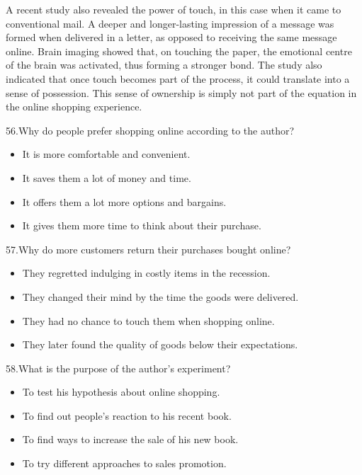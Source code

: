 \documentclass[UTF8,11pt]{ctexart}
\begin{document}
A recent study also revealed the power of touch, in this case when it came to conventional mail. A deeper and longer-lasting impression of a message was formed when delivered in a letter, as opposed to receiving the same message online. Brain imaging showed that, on touching the paper, the emotional centre of the brain was activated, thus forming a stronger bond. The study also indicated that once touch becomes part of the process, it could translate into a sense of possession. This sense of ownership is simply not part of the equation in the online shopping experience.


56.Why do people prefer shopping online according to the author?


\begin{itemize}[leftmargin=2em,itemsep=.2em,topsep=.4em]\item[A.] It is more comfortable and convenient.
\item[B.] It saves them a lot of money and time.
\item[C.] It offers them a lot more options and bargains.
\item[D.] It gives them more time to think about their purchase.
\end{itemize}

57.Why do more customers return their purchases bought online?


\begin{itemize}[leftmargin=2em,itemsep=.2em,topsep=.4em]\item[A.] They regretted indulging in costly items in the recession.
\item[B.] They changed their mind by the time the goods were delivered.
\item[C.] They had no chance to touch them when shopping online.
\item[D.] They later found the quality of goods below their expectations.
\end{itemize}

58.What is the purpose of the author’s experiment?


\begin{itemize}[leftmargin=2em,itemsep=.2em,topsep=.4em]\item[A.] To test his hypothesis about online shopping.
\item[B.] To find out people’s reaction to his recent book.
\item[C.] To find ways to increase the sale of his new book.
\item[D.] To try different approaches to sales promotion.
\end{itemize}
\end{document}
